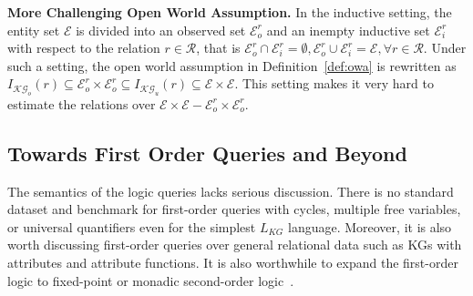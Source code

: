 \documentclass[11pt]{article}
\newcommand{\entity}{\mathcal{E}}
\newcommand{\relation}{\mathcal{R}}
\newcommand{\lang}{\mathcal{L}}
\newcommand{\kgnew}{\mathcal{KG}}
\begin{document}
\noindent\textbf{More Challenging Open World Assumption.}  In the inductive setting, the entity set $\entity$ is divided into an observed set $\entity_o^r$ and an inempty inductive set $\entity_i^r$ with respect to the relation $r\in \relation$, that is $\entity_o^r\cap\entity_i^r = \emptyset, \entity_o^r\cup\entity_i^r = \entity, \forall r\in\relation$. Under such a setting, the open world assumption in Definition~\ref{def:owa} is rewritten as $I_{\kgnew_o}(r) \subseteq \entity_o^r\times \entity_o^r \subseteq I_{\kgnew_u}(r) \subseteq \entity\times \entity$. This setting makes it very hard to estimate the relations over $\entity\times \entity - \entity_o^r\times \entity_o^r $.

\subsection{Towards First Order Queries and Beyond}
The semantics of the logic queries lacks serious discussion. There is no standard dataset and benchmark for first-order queries with cycles, multiple free variables, or universal quantifiers even for the simplest $L_{KG}$ language. Moreover, it is also worth discussing first-order queries over general relational data such as KGs with attributes and attribute functions. It is also worthwhile to expand the first-order logic to fixed-point or monadic second-order logic~\cite{Libkin2004ElementsFinite}.
\end{document}
